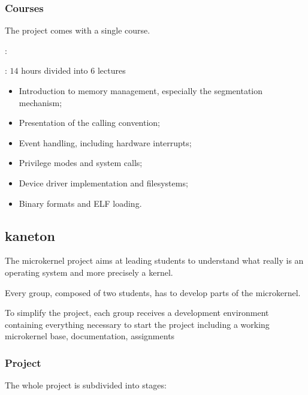 \begin{multicols}{2}
\subsubsection{Courses}

The project comes with a single course.


: 

: $14$ hours divided into $6$ lectures

\begin{itemize}
  \item
    Introduction to memory management, especially the segmentation mechanism;
  \item
    Presentation of the  calling convention;
  \item
    Event handling, including hardware interrupts;
  \item
    Privilege modes and system calls;
  \item
    Device driver implementation and filesystems;
  \item
    Binary formats and ELF loading.
\end{itemize}

%
%

\subsection{kaneton}

The  microkernel project aims at leading students to understand
what really is an operating system and more precisely a kernel.

Every group, composed of two students, has to develop parts of the
 microkernel.

To simplify the project, each group receives a development environment
containing everything necessary to start the project including a
working microkernel base, documentation, assignments \etc{}


\subsubsection{Project}

The whole  project is subdivided into stages:


\end{multicols}
